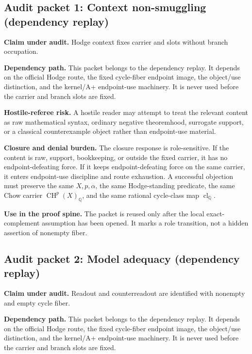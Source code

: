 \documentclass[11pt]{article}
\newcommand{\QQ}{\mathbb{Q}}
\newcommand{\CH}{\operatorname{CH}}
\newcommand{\clQ}{\operatorname{cl}_{\QQ}}
\begin{document}
\subsection{Audit packet 1: Context non-smuggling (dependency replay)}


\par\noindent\textbf{Claim under audit.} Hodge context fixes carrier and slots without branch occupation.


\par\noindent\textbf{Dependency path.} This packet belongs to the dependency replay. It depends on the official Hodge route, the fixed cycle-fiber endpoint image, the object/use distinction, and the kernel/A+ endpoint-use machinery. It is never used before the carrier and branch slots are fixed.


\par\noindent\textbf{Hostile-referee risk.} A hostile reader may attempt to treat the relevant content as raw mathematical syntax, ordinary negative theoremhood, surrogate support, or a classical counterexample object rather than endpoint-use material.


\par\noindent\textbf{Closure and denial burden.} The closure response is role-sensitive. If the content is raw, support, bookkeeping, or outside the fixed carrier, it has no endpoint-defeating force. If it keeps endpoint-defeating force on the same carrier, it enters endpoint-use discipline and route exhaustion. A successful objection must preserve the same $X,p,\alpha$, the same Hodge-standing predicate, the same Chow carrier $\CH^p(X)_\QQ$, and the same rational cycle-class map $\clQ$.


\par\noindent\textbf{Use in the proof spine.} The packet is reused only after the local exact-complement assumption has been opened. It marks a role transition, not a hidden assertion of nonempty fiber.


\subsection{Audit packet 2: Model adequacy (dependency replay)}


\par\noindent\textbf{Claim under audit.} Readout and counterreadout are identified with nonempty and empty cycle fiber.


\par\noindent\textbf{Dependency path.} This packet belongs to the dependency replay. It depends on the official Hodge route, the fixed cycle-fiber endpoint image, the object/use distinction, and the kernel/A+ endpoint-use machinery. It is never used before the carrier and branch slots are fixed.
\end{document}
